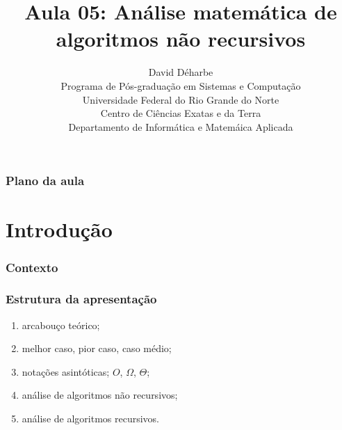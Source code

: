 \documentclass[handout]{beamer}
\title{Aula 05: Análise matemática de algoritmos não recursivos}
\author{David Déharbe \\
  Programa de Pós-graduação em Sistemas e Computação \\
  Universidade Federal do Rio Grande do Norte \\
  Centro de Ciências Exatas e da Terra \\
  Departamento de Informática e Matemáica Aplicada}
\date{}
\begin{document}
\begin{frame}
  \titlepage
\end{frame}

\begin{frame}
  \frametitle{Plano da aula}
  \tableofcontents
\end{frame}

\section{Introdução}

\begin{frame}

  \frametitle{Contexto}

  \begin{center}
  
  \end{center}
\end{frame}


\begin{frame}

  \frametitle{Estrutura da apresentação}

  \begin{enumerate}
  \item arcabouço teórico;
  \item melhor caso, pior caso, caso médio;
  \item notações asintóticas; $O$, $\Omega$, $\Theta$;
  \item \alert{análise de algoritmos não recursivos};
  \item análise de algoritmos recursivos.
  \end{enumerate}
\end{frame}
\end{document}
